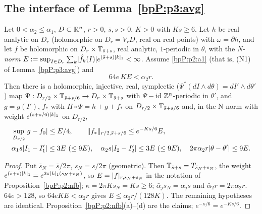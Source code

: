 \subsection{The interface of Lemma~\ref{bpP:p3:avg}}\label{bpP:p2:s-avg}

\begin{corollary}\label{bpP:p2:avg}
Let $0<\alpha_2\le\alpha_1$, $D\subset\mathbb{R}^n$, $r>0$, $\bar s,s>0$, $K>0$ with $Ks\ge6$. Let $h$ be real analytic on $D_r$ (holomorphic on $D_r=V_rD$, real on real points) with $\omega=\partial h$, and let $f$ be holomorphic on $D_r\times\mathbb{T}_{\bar s+s}$, real analytic, $1$-periodic in $\theta$, with the \emph{N-norm}
$E:=\sup_{I\in D_r}\sum_k\lvert \hat f_k(I)\rvert e^{(\bar s+s)\lvert k\rvert_1}<\infty$. Assume \ref{bpP:p2:a1} (that is, (N1) of Lemma~\ref{bpP:p3:avg}) and
\[64e\,KE<\alpha_2r.\]
Then there is a holomorphic, injective, real, symplectic ($\Psi^*(dI\wedge d\theta)=dI'\wedge d\theta'$) map $\Psi:D_{r/2}\times\mathbb{T}_{\bar s+s/6}\to D_r\times\mathbb{T}_{\bar s+s}$ with $\Psi-\mathrm{id}$ $\mathbb{Z}^n$-periodic in $\theta'$, and $g=g(I')$, $f_*$ with $H\circ\Psi=h+g+f_*$ on $D_{r/2}\times\mathbb{T}_{\bar s+s/6}$ and, in the N-norm with weight $e^{(\bar s+s/6)\lvert k\rvert_1}$ on $D_{r/2}$,
\begin{align*}
&\sup_{D_{r/2}}\abs{g-f_0}\le E/4,\qquad \norm{f_*}_{r/2,\bar s+s/6}\le e^{-Ks/6}E,\\
&\alpha_1s\abs{I_1-I_1'}\le3E\ (\le 9E),\quad\alpha_2s\abs{I_2-I_2'}\le3E\ (\le9E),\quad2\pi\alpha_2r\abs{\theta-\theta'}\le9E.
\end{align*}
\end{corollary}
\begin{proof}
\label{stepP:p2:av-dict} Put $\bar s_N=\bar s/2\pi$, $s_N=s/2\pi$ (geometric). Then $\mathbb{T}_{\bar s+s}=T_{\bar s_N+s_N}$, the weight $e^{(\bar s+s)\lvert k\rvert_1}=e^{2\pi\lvert k\rvert_1(\bar s_N+s_N)}$, so $E=\lvert f\rvert_{r,\bar s_N+s_N}$ in the notation of Proposition~\ref{bpP:p2:nfb}; $\kappa=2\pi Ks_N=Ks\ge6$; $\bar\alpha_js_N=\alpha_js$ and $\bar\alpha_2r=2\pi\alpha_2r$.
\label{stepP:p2:av-hyp} $64e>128$, so $64eKE<\alpha_2r$ gives $E\le\alpha_2r/(128K)$. The remaining hypotheses are identical. Proposition~\ref{bpP:p2:nfb}(a)--(d) are the claims; $e^{-\kappa/6}=e^{-Ks/6}$.
\end{proof}

